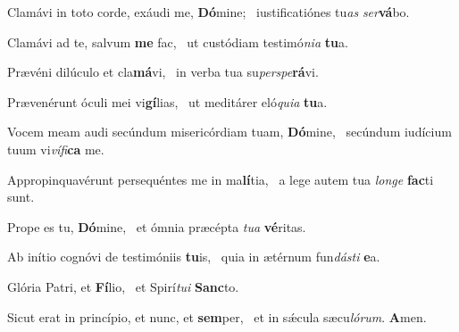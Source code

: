 \item Clamávi in toto corde, exáudi me, \textbf{Dó}mine;~\psstar{} iustificatiónes tu\textit{as} \textit{ser}\textbf{vá}bo.

\item Clamávi ad te, salvum \textbf{me} fac,~\psstar{} ut custódiam testimó\textit{nia} \textbf{tu}a.

\item Prævéni dilúculo et cla\textbf{má}vi,~\psstar{} in verba tua su\textit{perspe}\textbf{rá}vi.

\item Prævenérunt óculi mei vi\textbf{gí}lias,~\psstar{} ut meditárer eló\textit{quia} \textbf{tu}a.

\item Vocem meam audi secúndum misericórdiam tuam, \textbf{Dó}mine,~\psstar{} secúndum iudícium tuum vi\textit{vífi}\textbf{ca} me.

\item Appropinquavérunt persequéntes me in ma\textbf{lí}tia,~\psstar{} a lege autem tua \textit{longe} \textbf{fac}ti sunt.

\item Prope es tu, \textbf{Dó}mine,~\psstar{} et ómnia præcépta \textit{tua} \textbf{vé}ritas.

\item Ab inítio cognóvi de testimóniis \textbf{tu}is,~\psstar{} quia in ætérnum fun\textit{dásti} \textbf{e}a.

\item Glória Patri, et \textbf{Fí}lio,~\psstar{} et Spirí\textit{tui} \textbf{Sanc}to.

\item Sicut erat in princípio, et nunc, et \textbf{sem}per,~\psstar{} et in sǽcula sæcu\textit{lórum}. \textbf{A}men.